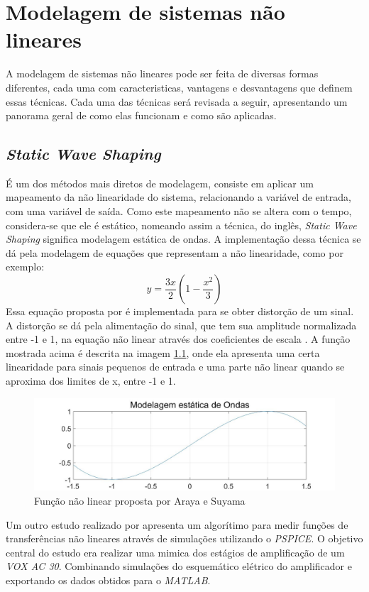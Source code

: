 
\chapter{Modelagem de sistemas não lineares}

A modelagem de sistemas não lineares pode ser feita de diversas formas diferentes, cada uma com caracteristicas, vantagens e desvantagens que definem essas técnicas. Cada uma das técnicas será revisada a seguir, apresentando um panorama geral de como elas funcionam e como são aplicadas.

\section*{\textit{Static Wave Shaping}}
É um dos métodos mais diretos de modelagem, consiste em aplicar um mapeamento da não linearidade do sistema, relacionando a variável de entrada, com uma variável de saída. Como este mapeamento não se altera com o tempo, considera-se que ele é estático, nomeando assim a técnica, do inglês, \textit{Static Wave Shaping} significa modelagem estática de ondas. A implementação dessa técnica se dá pela modelagem de equações que representam a não linearidade, como por exemplo:
\begin{equation}
y = \frac{3x}{2} (1 - \frac{{x^2}}{3})
\label{Equação1}
\end{equation}
Essa equação proposta por \cite{arayasuyama}  é implementada para se obter distorção de um sinal. A distorção se dá pela alimentação do sinal, que tem sua amplitude normalizada entre -1 e 1, na equação não linear através dos coeficientes de escala \cite{pakarinen2009review}. A função mostrada acima é descrita na imagem \ref{fig:staticwaveshaping}, onde ela apresenta uma certa linearidade para sinais pequenos de entrada e uma parte não linear quando se aproxima dos limites de x, entre -1 e 1.
\begin{figure}[htb!]
	\centering
	\includegraphics[width=0.7\linewidth]{figuras/StaticWaveShaping}
	\caption{Função não linear proposta por Araya e Suyama}
	\label{fig:staticwaveshaping}
\end{figure}

Um outro estudo realizado por \cite{moller2002measurement} apresenta um algorítimo para medir funções de transferências não lineares através de simulações utilizando o \textit{PSPICE}. O objetivo central do estudo era realizar uma mimica dos estágios de amplificação de um \textit{VOX AC 30}. Combinando simulações do esquemático elétrico do amplificador e exportando os dados obtidos para o \textit{MATLAB}.

